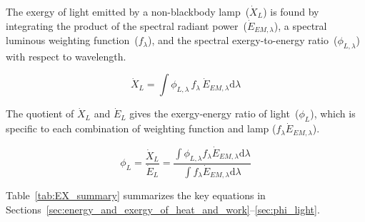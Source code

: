 \documentclass[energies,article,accept,moreauthors,pdftex]{Definitions/mdpi}\usepackage[]{graphicx}\usepackage[]{color}
\begin{document}
The exergy of light emitted by a non-blackbody lamp~($\dot{X}_L$)
is found by integrating the product of
the spectral radiant power~($\dot{E}_{EM,\lambda}$),
a spectral luminous weighting function~($f_\lambda$), and
the spectral exergy-to-energy ratio~($\phi_{L,\lambda}$)
with respect to wavelength.

\begin{equation} \label{eq:X_dot_L}
  \dot{X}_L = \int \phi_{L,\lambda} \, f_\lambda \, \dot{E}_{EM,\lambda} \mathrm{d}\lambda
\end{equation}

The quotient of $\dot{X}_L$ and $\dot{E}_L$ gives 
the exergy-energy ratio of light~($\phi_{L}$), 
which is specific to each combination of
weighting function and lamp ($f_\lambda \dot{E}_{EM,\lambda}$).

\begin{equation} \label{eq:phi_L}
  \phi_{L} = \frac{\dot{X}_L}{\dot{E}_L} 
           = \frac {\int \phi_{L,\lambda} f_\lambda \dot{E}_{EM,\lambda} \mathrm{d}\lambda}
                       {\int f_\lambda \dot{E}_{EM,\lambda} \mathrm{d}\lambda}
\end{equation}

Table~\ref{tab:EX_summary} summarizes the key equations in 
Sections~\ref{sec:energy_and_exergy_of_heat_and_work}--\ref{sec:phi_light}.
\end{document}
